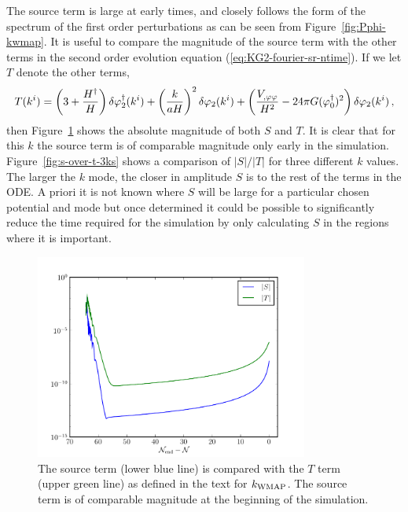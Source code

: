 The source term is large at early times, and closely follows the form
of the spectrum of the first order perturbations as can be seen from
Figure~\ref{fig:Pphi-kwmap}.
%
It is useful to compare the magnitude of the source term with the
other terms in the second order evolution equation
(\ref{eq:KG2-fourier-sr-ntime}). If we let $T$ denote the other terms,
%
\begin{equation}
\label{eq:Tdefn}
 T(k^i) = \left(3 + \frac{H^{\dagger}}{H}\right)
\delta\varphi_{2}^{\dagger}(k^i)+ \left(\frac{k}{aH}\right)^2\delta\varphi_{2}(k^i)
+\left(\frac{V_{,\varphi\varphi}}{H^2}-{24 \pi G}(\varphi_{0}^{\dagger})^2\right)
\delta\varphi_{2}(k^i) \,,
\end{equation}
%
then Figure~\ref{fig:src-vs-others} shows the absolute magnitude of
both $S$ and $T$.  It is clear that for this $k$ the source term is of comparable
magnitude only early in the simulation.  Figure~\ref{fig:s-over-t-3ks}
shows a comparison of $|S|/|T|$ for three different $k$ values. The larger the
$k$ mode, the closer in amplitude $S$ is to the rest of the terms in the ODE.
A priori it is not known where $S$ will be large for a particular chosen potential
and mode but once determined it could be possible to significantly reduce the time
required for the simulation by only calculating $S$ in the regions where it is
important.
%
\begin{figure}
\centering
 \includegraphics[width=0.8\textwidth]{numerical/graphs/src-vs-t-kwmap-large}
\caption[Source term compared to $T$ term]{The source term (lower blue line) is
compared with the $T$ term
(upper green line) as defined in the text for $k_\mathrm{WMAP}$. The source term is of
comparable magnitude at the beginning of the simulation.}
 \label{fig:src-vs-others}
\end{figure}
% 

